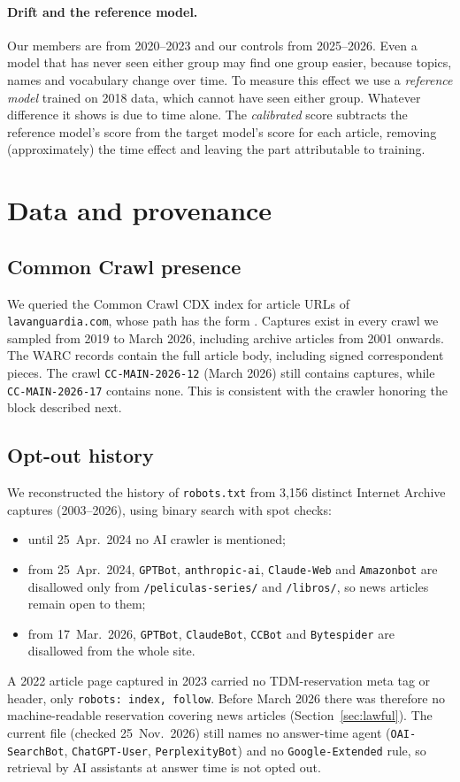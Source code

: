 \documentclass[10pt,a4paper]{article}
\begin{document}
\paragraph{Drift and the reference model.} Our members are from 2020--2023 and our controls from 2025--2026. Even a
model that has never seen either group may find one group easier, because topics, names and vocabulary change over
time. To measure this effect we use a \emph{reference model} trained on 2018 data, which cannot have seen either
group. Whatever difference it shows is due to time alone. The \emph{calibrated} score subtracts the reference model's
score from the target model's score for each article, removing (approximately) the time effect and leaving the part
attributable to training.

\section{Data and provenance}
\subsection{Common Crawl presence}
We queried the Common Crawl CDX index for article URLs of \texttt{lavanguardia.com}, whose path has the form
. Captures exist in every crawl we sampled from 2019 to March 2026, including
archive articles from 2001 onwards. The WARC records contain the full article body, including signed correspondent
pieces. The crawl \texttt{CC-MAIN-2026-12} (March 2026) still contains captures, while \texttt{CC-MAIN-2026-17}
contains none. This is consistent with the crawler honoring the block described next.

\subsection{Opt-out history}
We reconstructed the history of \texttt{robots.txt} from 3,156 distinct Internet Archive captures (2003--2026),
using binary search with spot checks:
\begin{itemize}
\item until 25~Apr.~2024 no AI crawler is mentioned;
\item from 25~Apr.~2024, \texttt{GPTBot}, \texttt{anthropic-ai}, \texttt{Claude-Web} and \texttt{Amazonbot} are disallowed
only from \texttt{/peliculas-series/} and \texttt{/libros/}, so news articles remain open to them;
\item from 17~Mar.~2026, \texttt{GPTBot}, \texttt{ClaudeBot}, \texttt{CCBot} and \texttt{Bytespider} are disallowed from the
whole site.
\end{itemize}
A 2022 article page captured in 2023 carried no TDM-reservation meta tag or header, only
\texttt{robots: index, follow}. Before March 2026 there was therefore no machine-readable reservation covering news
articles (Section~\ref{sec:lawful}). The current file (checked 25~Nov.~2026) still names no answer-time agent
(\texttt{OAI-SearchBot}, \texttt{ChatGPT-User}, \texttt{PerplexityBot}) and no \texttt{Google-Extended} rule, so
retrieval by AI assistants at answer time is not opted out.
\end{document}
